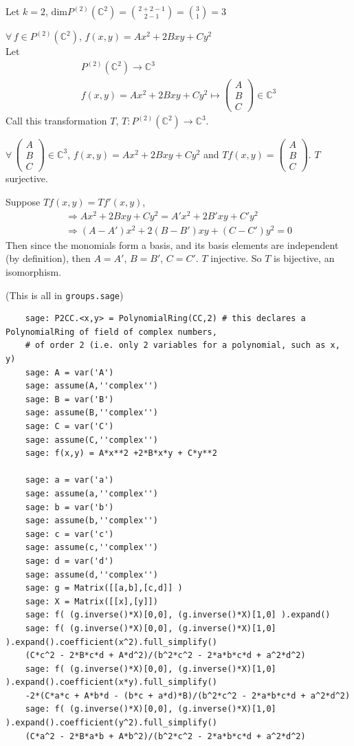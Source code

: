 \begin{enumerate}
	Let $k=2$, $\text{dim}P^{(2)}(\mathbb{C}^2) = \binom{2+2-1}{2-1} = \binom{3}{1} = 3$
	
	$\forall \, f \in P^{(2)}(\mathbb{C}^2)$, $f(x,y) = Ax^2 + 2Bxy + Cy^2$ \\
	Let 
	\[
	\begin{gathered}
	P^{(2)}(\mathbb{C}^2) \to \mathbb{C}^3 \\ 
	f(x,y) = Ax^2 + 2Bxy + Cy^2 \mapsto \left( \begin{matrix} A \\ B \\ C \end{matrix} \right) \in \mathbb{C}^3
	\end{gathered}
	\]
	Call this transformation $T$, $T: P^{(2)}(\mathbb{C}^2) \to \mathbb{C}^3$.  
	
	$\forall \, \left( \begin{matrix} A \\ B \\ C \end{matrix} \right) \in \mathbb{C}^3$, $f(x,y) = Ax^2 + 2Bxy + Cy^2$ and $Tf(x,y) = \left( \begin{matrix} A \\ B \\ C \end{matrix} \right)$.  $T$ surjective.  
	
	Suppose $Tf(x,y) = Tf'(x,y)$, 
	\[
	\begin{gathered}
	\Longrightarrow Ax^2 + 2Bxy + Cy^2 = A'x^2 + 2B'xy + C'y^2 \\ 
	\Longrightarrow (A-A')x^2 + 2(B-B')xy + (C-C')y^2 = 0
	\end{gathered}
	\]
	Then since the monomials form a basis, and its basis elements are independent (by definition), then $A=A'$, $B=B'$, $C=C'$.  $T$ injective.  So $T$ is bijective, an isomorphism.  
	
	(This is all in \verb|groups.sage|)
	\begin{lstlisting}
	sage: P2CC.<x,y> = PolynomialRing(CC,2) # this declares a PolynomialRing of field of complex numbers, 
	# of order 2 (i.e. only 2 variables for a polynomial, such as x, y)
	sage: A = var('A')
	sage: assume(A,''complex'')
	sage: B = var('B')
	sage: assume(B,''complex'')
	sage: C = var('C')
	sage: assume(C,''complex'')
	sage: f(x,y) = A*x**2 +2*B*x*y + C*y**2
	
	sage: a = var('a')
	sage: assume(a,''complex'')
	sage: b = var('b')
	sage: assume(b,''complex'')
	sage: c = var('c')
	sage: assume(c,''complex'')
	sage: d = var('d')
	sage: assume(d,''complex'')
	sage: g = Matrix([[a,b],[c,d]] )
	sage: X = Matrix([[x],[y]])
	sage: f( (g.inverse()*X)[0,0], (g.inverse()*X)[1,0] ).expand()
	sage: f( (g.inverse()*X)[0,0], (g.inverse()*X)[1,0] ).expand().coefficient(x^2).full_simplify()
	(C*c^2 - 2*B*c*d + A*d^2)/(b^2*c^2 - 2*a*b*c*d + a^2*d^2)
	sage: f( (g.inverse()*X)[0,0], (g.inverse()*X)[1,0] ).expand().coefficient(x*y).full_simplify()
	-2*(C*a*c + A*b*d - (b*c + a*d)*B)/(b^2*c^2 - 2*a*b*c*d + a^2*d^2)
	sage: f( (g.inverse()*X)[0,0], (g.inverse()*X)[1,0] ).expand().coefficient(y^2).full_simplify()
	(C*a^2 - 2*B*a*b + A*b^2)/(b^2*c^2 - 2*a*b*c*d + a^2*d^2)
	\end{lstlisting}
	

\end{enumerate}
